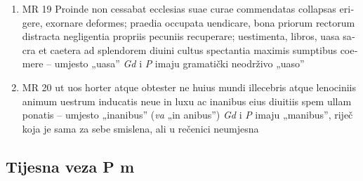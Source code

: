 \documentclass[a5paper,twoside]{article}
\begin{document}
\begin{enumerate}[label=\alph*)]
\item MR 19 \textlatin{Proinde non cessabat ecclesias suae curae commendatas collapsas erigere, exornare deformes; praedia occupata uendicare, bona priorum rectorum distracta negligentia propriis pecuniis recuperare; uestimenta, libros, uasa sacra et caetera ad splendorem diuini cultus spectantia maximis sumptibus coemere} – umjesto „uasa” \textit{Gd} i \textit{P} imaju gramatički neodrživo „uaso”
\item MR 20 \textlatin{ut uos horter atque obtester ne huius mundi illecebris atque lenociniis animum uestrum inducatis neue in luxu ac inanibus eius diuitiis spem ullam ponatis} – umjesto „inanibus” (\textit{va} „in anibus”) \textit{Gd} i \textit{P} imaju „manibus”, riječ koja je sama za sebe smislena, ali u rečenici neumjesna
\end{enumerate}
\subsection{Tijesna veza P m}
\end{document}
